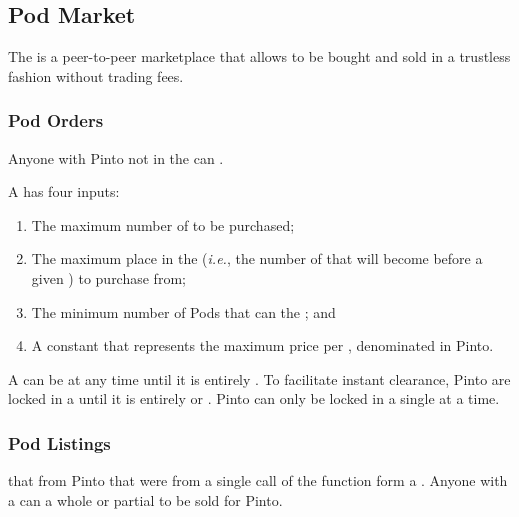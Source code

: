 \documentclass[class=article, crop=false]{standalone}
\begin{document}

\subsection{Pod Market}

The  is a peer-to-peer marketplace that allows  to be bought and sold in a trustless fashion without trading fees.


\subsubsection{Pod Orders}

Anyone with Pinto not in the  can  . 

A  has four inputs:
\begin{enumerate}
    \item The maximum number of  to be purchased;
    \item The maximum place in the  (\textit{i.e.}, the number of  that will become  before a given ) to purchase from;
    \item The minimum number of Pods that can  the ; and
    \item A constant that represents the maximum price per , denominated in Pinto.
\end{enumerate}

A  can be  at any time until it is entirely . To facilitate instant clearance, Pinto are locked in a  until it is entirely  or . Pinto can only be locked in a single  at a time.


\subsubsection{Pod Listings}

 that  from Pinto that were  from a single call of the  function form a . Anyone with a  can  a whole or partial  to be sold for Pinto.
\end{document}
